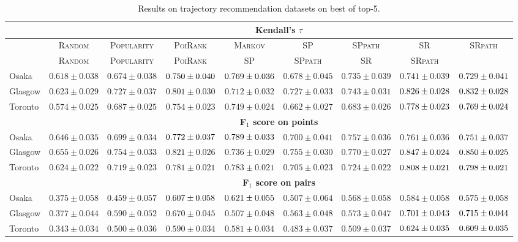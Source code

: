 \begin{table*}[!h]
\centering
\small
\setlength{\tabcolsep}{3pt} %
\begin{tabular}{l|cc|ccc|ccc} \hline
& \multicolumn{8}{c}{\bf Kendall's $\tau$} \\ \hline
 & \textsc{Random} & \textsc{Popularity} & \textsc{PoiRank} & \textsc{Markov} & \textsc{SP} & \textsc{SPpath} & \textsc{SR} & \textsc{SRpath} \\ \hline
 & \textsc{Random} & \textsc{Popularity} & \textsc{PoiRank} & \textsc{SP} & \textsc{SPpath} & \textsc{SR} & \textsc{SRpath} \\ \hline
Osaka & $0.618\pm0.038$ & $0.674\pm0.038$ & $\secondBest{0.750\pm0.040}$ & $\firstBest{0.769\pm0.036}$ & $0.678\pm0.045$ & $0.735\pm0.039$ & $0.741\pm0.039$ & $0.729\pm0.041$ \\
Glasgow & $0.623\pm0.029$ & $0.727\pm0.037$ & $0.801\pm0.030$ & $0.712\pm0.032$ & $0.727\pm0.033$ & $0.743\pm0.031$ & $\secondBest{0.826\pm0.028}$ & $\firstBest{0.832\pm0.028}$ \\
Toronto & $0.574\pm0.025$ & $0.687\pm0.025$ & $0.754\pm0.023$ & $0.749\pm0.024$ & $0.662\pm0.027$ & $0.683\pm0.026$ & $\firstBest{0.778\pm0.023}$ & $\secondBest{0.769\pm0.024}$ \\
\hline
& \multicolumn{8}{c}{\bf F$_1$ score on points} \\ \hline
Osaka & $0.646\pm0.035$ & $0.699\pm0.034$ & $\secondBest{0.772\pm0.037}$ & $\firstBest{0.789\pm0.033}$ & $0.700\pm0.041$ & $0.757\pm0.036$ & $0.761\pm0.036$ & $0.751\pm0.037$ \\
Glasgow & $0.655\pm0.026$ & $0.754\pm0.033$ & $0.821\pm0.026$ & $0.736\pm0.029$ & $0.755\pm0.030$ & $0.770\pm0.027$ & $\secondBest{0.847\pm0.024}$ & $\firstBest{0.850\pm0.025}$ \\
Toronto & $0.624\pm0.022$ & $0.719\pm0.023$ & $0.781\pm0.021$ & $0.783\pm0.021$ & $0.705\pm0.023$ & $0.724\pm0.022$ & $\firstBest{0.808\pm0.021}$ & $\secondBest{0.798\pm0.021}$ \\
\hline
& \multicolumn{8}{c}{\bf F$_1$ score on pairs} \\ \hline
Osaka & $0.375\pm0.058$ & $0.459\pm0.057$ & $\secondBest{0.607\pm0.058}$ & $\firstBest{0.621\pm0.055}$ & $0.507\pm0.064$ & $0.568\pm0.058$ & $0.584\pm0.058$ & $0.575\pm0.058$ \\
Glasgow & $0.377\pm0.044$ & $0.590\pm0.052$ & $0.670\pm0.045$ & $0.507\pm0.048$ & $0.563\pm0.048$ & $0.573\pm0.047$ & $\secondBest{0.701\pm0.043}$ & $\firstBest{0.715\pm0.044}$ \\
Toronto & $0.343\pm0.034$ & $0.500\pm0.036$ & $0.590\pm0.034$ & $0.581\pm0.034$ & $0.483\pm0.037$ & $0.509\pm0.037$ & $\firstBest{0.624\pm0.035}$ & $\secondBest{0.609\pm0.035}$ \\
\hline
\end{tabular}
\caption{Results on trajectory recommendation datasets on best of top-5.}
\end{table*}


